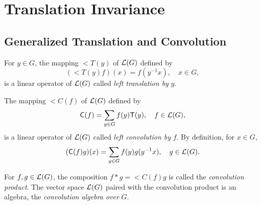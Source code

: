 
\section{Translation Invariance}
\subsection{Generalized Translation and Convolution}
For $y\in G$, the mapping $\lt{T}(y)$ of $\mathcal{L}(G)$ defined by 
\begin{equation}\label{eq:trans}
(\lt{T}(y)f)(x) = f(y^{-1}x), \quad x \in G,
\end{equation}
is a linear operator of $\mathcal{L}(G)$ called 
\emph{left translation by} $y$.

The mapping $\lt{C}(f)$ of $\mathcal{L}(G)$ defined by 
\begin{equation}
\mathsf{C}(f) = \sum_{y\in G} f(y) \mathsf{T}(y), \quad f\in \mathcal{L}(G),
\end{equation}
is a linear operator of $\mathcal{L}(G)$ called 
\emph{left convolution by} $f$.  By definition, for $x\in G$,
\begin{equation}\label{eq:conv}
(\mathsf{C}(f)g)(x) = \sum_{y\in G} f(y) g(y^{-1}x), \quad g \in \mathcal{L}(G).
\end{equation}

For $f, g \in \mathcal{L}(G)$, the composition
$f * g  = \lt{C}(f)g$
is called the \emph{convolution product}.
The vector space $\mathcal{L}(G)$ paired with the convolution product
is an algebra, the \emph{convolution algebra over} $G$.

